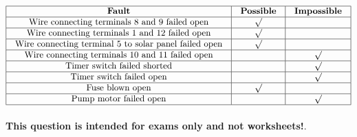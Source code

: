






$$\vbox{\offinterlineskip
\halign{\strut
\vrule \quad\hfil # \ \hfil & 
\vrule \quad\hfil # \ \hfil & 
\vrule \quad\hfil # \ \hfil \vrule \cr
\noalign{\hrule}
%
{\bf Fault} & {\bf Possible} & {\bf Impossible} \cr
%
\noalign{\hrule}
%
Wire connecting terminals 8 and 9 failed open & $\surd$ &  \cr
%
\noalign{\hrule}
%
Wire connecting terminals 1 and 12 failed open & $\surd$ &  \cr
%
\noalign{\hrule}
%
Wire connecting terminal 5 to solar panel failed open & $\surd$ &  \cr
%
\noalign{\hrule}
%
Wire connecting terminals 10 and 11 failed open &  & $\surd$ \cr
%
\noalign{\hrule}
%
Timer switch failed shorted &  & $\surd$ \cr
%
\noalign{\hrule}
%
Timer switch failed open &  & $\surd$ \cr
%
\noalign{\hrule}
%
Fuse blown open & $\surd$ &  \cr
%
\noalign{\hrule}
%
Pump motor failed open &  & $\surd$ \cr
%
\noalign{\hrule}
} %
}$$ %








{\bf This question is intended for exams only and not worksheets!}.



